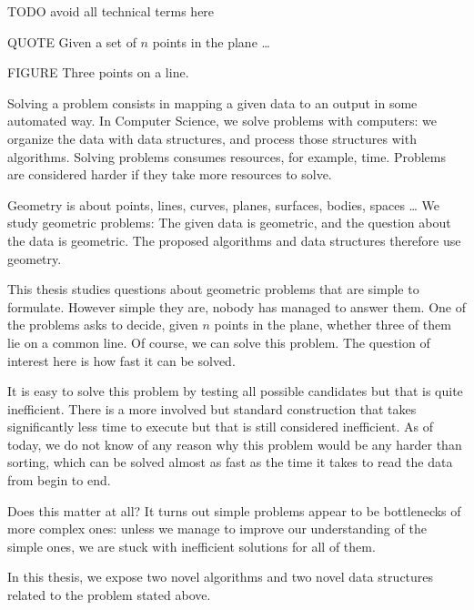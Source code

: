 
TODO avoid all technical terms here

QUOTE Given a set of \(n\) points in the plane \dots

FIGURE Three points on a line.

Solving a problem consists in mapping a given data to an output in some
automated way.
In Computer Science, we solve problems with computers: we organize the data
with data structures, and process those structures with algorithms.
%
Solving problems consumes resources, for example, time.
Problems are considered harder if they take more resources to solve.

Geometry is about points, lines, curves, planes, surfaces, bodies, spaces \dots
We study geometric problems:
%
The given data is geometric, and the question about the data is geometric.
The proposed algorithms and data structures therefore use geometry.

This thesis studies questions about geometric problems that are simple to
formulate. However simple they are, nobody
has managed to answer them. One of the problems asks to decide, given \(n\) points in the plane,
whether three of them lie on a common line. Of course, we can solve this
problem. The question of interest here is how fast it can be solved.

It is easy to solve this problem by testing all possible candidates but that is
quite inefficient. There is a
more involved but standard construction that takes significantly less time to
execute but that is still considered inefficient. As of today, we do not know of
any reason why this problem would be any harder than sorting, which can be
solved almost as fast as the time it takes to read the data from begin to end.

Does this matter at all? It turns out simple problems appear to
be bottlenecks of more complex ones: unless we manage to improve our
understanding of the simple ones, we are stuck with inefficient solutions for
all of them.

In this thesis, we expose two novel algorithms and two novel data
structures related to the problem stated above.
